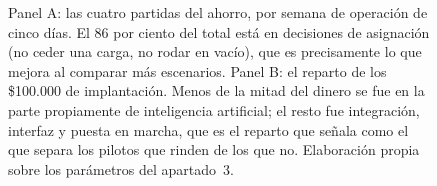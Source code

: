 \documentclass[11pt,letterpaper]{article}
\begin{document}
\begin{figure}[!htb]
\caption{Panel A: las cuatro partidas del ahorro, por semana de operación de
cinco días. El 86 por ciento del total está en decisiones de asignación (no
ceder una carga, no rodar en vacío), que es precisamente lo que mejora al
comparar más escenarios. Panel B: el reparto de los \$100.000 de implantación.
Menos de la mitad del dinero se fue en la parte propiamente de inteligencia
artificial; el resto fue integración, interfaz y puesta en marcha, que es el
reparto que \textcite{nanda2025} señala como el que separa los pilotos que
rinden de los que no. Elaboración propia sobre los parámetros del apartado~3.}
\label{fig:dinero}
\end{figure}
\end{document}

